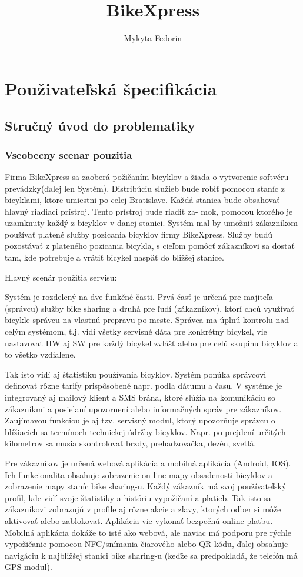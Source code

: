 \documentclass[12pt]{report}
\author{Mykyta Fedorin}
\title{BikeXpress}
\date{}
\begin{document}
\maketitle

\chapter{Použivateľská špecifikácia}
\section{Stručný úvod do problematiky}
\subsection{Vseobecny scenar pouzitia}

Firma BikeXpress sa zaoberá požičaním bicyklov a žiada o vytvorenie softvéru prevádzky(ďalej
len Systém). Distribúciu služieb bude robiť pomocou staníc z bicyklami, ktore umiestni po celej
Bratislave. Každá stanica bude obsahovať hlavný riadiaci prístroj. Tento prístroj bude riadiť za-
mok, pomocou ktorého je uzamknuty každý z bicyklov v danej stanici. Systém mal by umožniť
zákazníkom používať platené služby pozicania bicyklov firmy BikeXpress. Služby budú pozostávať
z plateného pozicania bicykla, s cieľom pomôcť zákazníkovi sa dostať tam, kde potrebuje a vrátiť
bicykel naspäť do bližšej stanice.

Hlavný scenár použitia servisu:

Systém je rozdelený na dve funkčné časti. Prvá časť je určená pre majiteľa (správcu) služby bike
sharing a druhá pre ľudí (zákazníkov), ktorí chcú využívať bicykle správcu na vlastnú prepravu po
meste. Správca ma úplnú kontrolu nad celým systémom, t.j. vidí všetky servisné dáta pre konkrétny
bicykel, vie nastavovať HW aj SW pre každý bicykel zvlášť alebo pre celú skupinu bicyklov a to všetko
vzdialene. 

Tak isto vidí aj štatistiku používania bicyklov. Systém ponúka správcovi definovať rôzne
tarify prispôsobené napr. podľa dátumu a času. V systéme je integrovaný aj mailový klient a SMS brána,
ktoré slúžia na komunikáciu so zákazníkmi a posielaní upozornení alebo informačných správ pre
zákazníkov. Zaujímavou funkciou je aj tzv. servisný modul, ktorý upozorňuje správcu o blížiacich sa
termínoch technickej údržby bicyklov. Napr. po prejdení určitých kilometrov sa musia skontrolovať
brzdy, prehadzovačka, dezén, svetlá. 

Pre zákazníkov je určená webová aplikácia a mobilná aplikácia
(Android, IOS). Ich funkcionalita obsahuje zobrazenie on-line mapy obsadenosti bicyklov a zobrazenie
mapy staníc bike sharing-u. Každý zákazník má svoj používateľský profil, kde vidí svoje štatistiky
a históriu vypožičaní a platieb. Tak isto sa zákazníkovi zobrazujú v profile aj rôzne akcie a zľavy,
ktorých odber si môže aktivovať alebo zablokovať. Aplikácia vie vykonať bezpečnú online platbu.
Mobilná aplikácia dokáže to isté ako webová, ale naviac má podporu pre rýchle vypožičanie pomocou
NFC/snímania čiarového alebo QR kódu, ďalej obsahuje navigáciu k najbližšej stanici bike sharing-u
(keďže sa predpokladá, že telefón má GPS modul).
\end{document}
